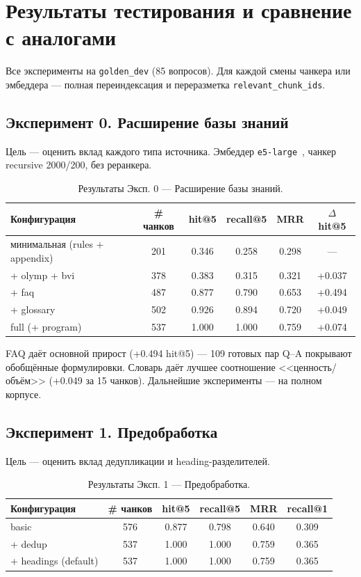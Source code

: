 \documentclass[a4paper,12pt]{extarticle}
\begin{document}
\section{Результаты тестирования и сравнение с аналогами}

Все эксперименты на \texttt{golden\_dev} (85 вопросов). Для каждой смены чанкера или эмбеддера --- полная переиндексация и переразметка \texttt{relevant\_chunk\_ids}.

\subsection{Эксперимент 0. Расширение базы знаний}

Цель --- оценить вклад каждого типа источника. Эмбеддер \texttt{e5-large}~\cite{e5}, чанкер recursive 2000/200, без реранкера.

\begin{table}[ht]
\caption{Результаты Эксп. 0 --- Расширение базы знаний.}
\label{tab:exp0}
\centering
\begin{tabular}{lccccc}
\toprule
Конфигурация & \# чанков & hit@5 & recall@5 & MRR & $\Delta$ hit@5 \\
\midrule
минимальная (rules + appendix) & 201 & 0.346 & 0.258 & 0.298 & --- \\
+ olymp + bvi & 378 & 0.383 & 0.315 & 0.321 & +0.037 \\
+ faq & 487 & 0.877 & 0.790 & 0.653 & +0.494 \\
+ glossary & 502 & 0.926 & 0.894 & 0.720 & +0.049 \\
full (+ program) & 537 & 1.000 & 1.000 & 0.759 & +0.074 \\
\bottomrule
\end{tabular}
\end{table}

FAQ даёт основной прирост (+0.494 hit@5) --- 109 готовых пар Q--A покрывают обобщённые формулировки. Словарь даёт лучшее соотношение <<ценность/объём>> (+0.049 за 15 чанков). Дальнейшие эксперименты --- на полном корпусе.

\subsection{Эксперимент 1. Предобработка}

Цель --- оценить вклад дедупликации и heading-разделителей.

\begin{table}[ht]
\caption{Результаты Эксп. 1 --- Предобработка.}
\label{tab:exp1}
\centering
\begin{tabular}{lccccc}
\toprule
Конфигурация & \# чанков & hit@5 & recall@5 & MRR & recall@1 \\
\midrule
basic & 576 & 0.877 & 0.798 & 0.640 & 0.309 \\
+ dedup & 537 & 1.000 & 1.000 & 0.759 & 0.365 \\
+ headings (default) & 537 & 1.000 & 1.000 & 0.759 & 0.365 \\
\bottomrule
\end{tabular}
\end{table}
\end{document}
